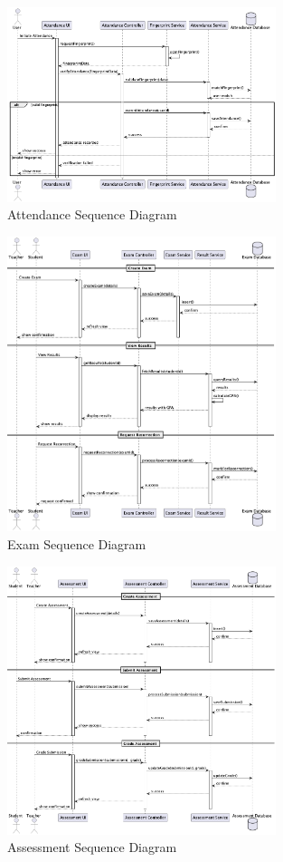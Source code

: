 \documentclass[12pt,a4paper]{report}
\begin{document}
\begin{figure}[h]
    \centering
    \includegraphics[width=0.7\textwidth]{attendance-sequence.png}
    \caption{Attendance Sequence Diagram}
    \label{fig:attendance-sequence}
\end{figure}

\begin{figure}[h]
    \centering
    \includegraphics[width=0.7\textwidth]{exam-sequence.png}
    \caption{Exam Sequence Diagram}
    \label{fig:exam-sequence}
\end{figure}

\begin{figure}[h]
    \centering
    \includegraphics[width=0.7\textwidth]{assessment-sequence.png}
    \caption{Assessment Sequence Diagram}
    \label{fig:assessment-sequence}
\end{figure}
\end{document}
